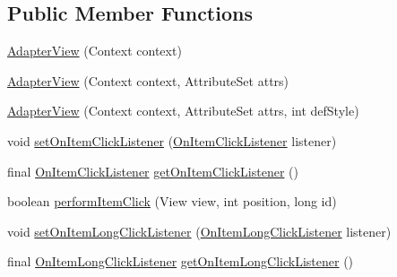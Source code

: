 \subsection*{Public Member Functions}
\begin{DoxyCompactItemize}
\item 
\hyperlink{classit_1_1sephiroth_1_1android_1_1library_1_1widget_1_1_adapter_view_ad4acc384876541187b4ac3ae970ec1c9}{Adapter\+View} (Context context)
\item 
\hyperlink{classit_1_1sephiroth_1_1android_1_1library_1_1widget_1_1_adapter_view_aa3f3041f8b5843a2ab280c82bb3c4e82}{Adapter\+View} (Context context, Attribute\+Set attrs)
\item 
\hyperlink{classit_1_1sephiroth_1_1android_1_1library_1_1widget_1_1_adapter_view_a64d4dbbc38daa2e2b4ee9a9e905686d5}{Adapter\+View} (Context context, Attribute\+Set attrs, int def\+Style)
\item 
void \hyperlink{classit_1_1sephiroth_1_1android_1_1library_1_1widget_1_1_adapter_view_ac00d547d3d94e89a9586138397c80671}{set\+On\+Item\+Click\+Listener} (\hyperlink{interfaceit_1_1sephiroth_1_1android_1_1library_1_1widget_1_1_adapter_view_1_1_on_item_click_listener}{On\+Item\+Click\+Listener} listener)
\item 
final \hyperlink{interfaceit_1_1sephiroth_1_1android_1_1library_1_1widget_1_1_adapter_view_1_1_on_item_click_listener}{On\+Item\+Click\+Listener} \hyperlink{classit_1_1sephiroth_1_1android_1_1library_1_1widget_1_1_adapter_view_ab95d76e1c0e7b1ff6a0ade5663b5dfca}{get\+On\+Item\+Click\+Listener} ()
\item 
boolean \hyperlink{classit_1_1sephiroth_1_1android_1_1library_1_1widget_1_1_adapter_view_a1ac126dbd16dfdffb74688fc96e82725}{perform\+Item\+Click} (View view, int position, long id)
\item 
void \hyperlink{classit_1_1sephiroth_1_1android_1_1library_1_1widget_1_1_adapter_view_aeaf2cf48901c2476c0d65e6e91e5cb93}{set\+On\+Item\+Long\+Click\+Listener} (\hyperlink{interfaceit_1_1sephiroth_1_1android_1_1library_1_1widget_1_1_adapter_view_1_1_on_item_long_click_listener}{On\+Item\+Long\+Click\+Listener} listener)
\item 
final \hyperlink{interfaceit_1_1sephiroth_1_1android_1_1library_1_1widget_1_1_adapter_view_1_1_on_item_long_click_listener}{On\+Item\+Long\+Click\+Listener} \hyperlink{classit_1_1sephiroth_1_1android_1_1library_1_1widget_1_1_adapter_view_a249fa546658a3327469c7fcba144bb22}{get\+On\+Item\+Long\+Click\+Listener} ()
\item 

\end{DoxyCompactItemize}
